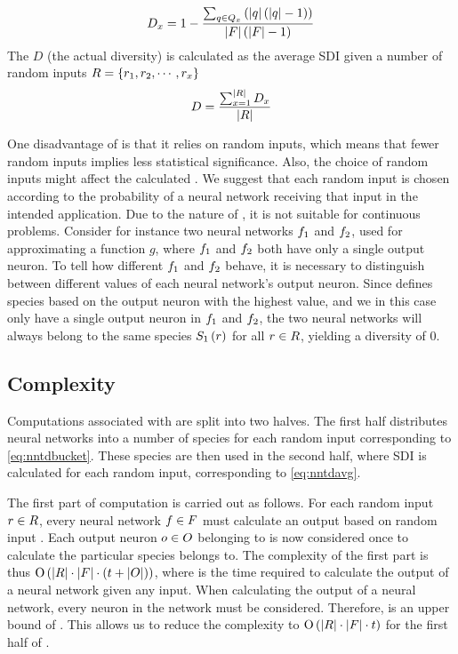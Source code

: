 %
\begin{equation*}\label{eq:nntd}
  D_x = 1 - \frac{\sum_{q \in Q_{x}}\left(\lvert q\rvert\left(\lvert q\rvert - 1\right)\right)}{\lvert F\rvert\left(\lvert F\rvert - 1\right)}
\end{equation*}
%
The \dia{} $D$ (the actual diversity) is calculated as the average SDI given a number of random inputs $R = \left\{ r_1, r_2, \cdots, r_x \right\}$
%
\begin{equation}\label{eq:nntdavg}
  D =\frac{\sum_{x=1}^{\lvert R\rvert}{D_x}}{\lvert R\rvert}
\end{equation}
%

One disadvantage of \dia{} is that it relies on random inputs, which means that fewer random inputs implies less statistical significance. Also, the choice of random inputs might affect the calculated \dia. We suggest that each random input is chosen according to the probability of a neural network receiving that input in the intended application. 
Due to the nature of \dia, it is not suitable for continuous problems. Consider for instance two neural networks $f_1$ and $f_2$, used for approximating a function $g$, where $f_1$ and $f_2$ both have only a single output neuron. To tell how different $f_1$ and $f_2$ behave, it is necessary to distinguish between different values of each neural network's output neuron. Since \dia{} defines species based on the output neuron with the highest value, and we in this case only have a single output neuron in $f_1$ and $f_2$, the two neural networks will always belong to the same species $S_{1}\left(r\right)$ for all $r \in R$, yielding a diversity of 0.  

\subsection{Complexity}
Computations associated with \dia{} are split into two halves. The first half distributes neural networks into a number of species for each random input corresponding to \cref{eq:nntdbucket}. These species are then used in the second half, where SDI is calculated for each random input, corresponding to \cref{eq:nntdavg}.

The first part of computation is carried out as follows. For each random input $r \in R$, every neural network $f \in F$ must calculate an output based on random input \ran. Each output neuron $o \in O$ belonging to \ind{} is now considered once to calculate the particular species \ind{} belongs to. The complexity of the first part is thus $\operatorname{O}\left(\lvert R\rvert \cdot \lvert F\rvert \cdot \left(t + \lvert O\rvert\right)\right)$, where \timet{} is the time required to calculate the output of a neural network given any input. When calculating the output of a neural network, every neuron in the network must be considered. Therefore, \timet{} is an upper bound of \nnoutsetl. This allows us to reduce the complexity to $\operatorname{O}\left(\lvert R\rvert \cdot \lvert F\rvert \cdot t\right)$ for the first half of \dia.

